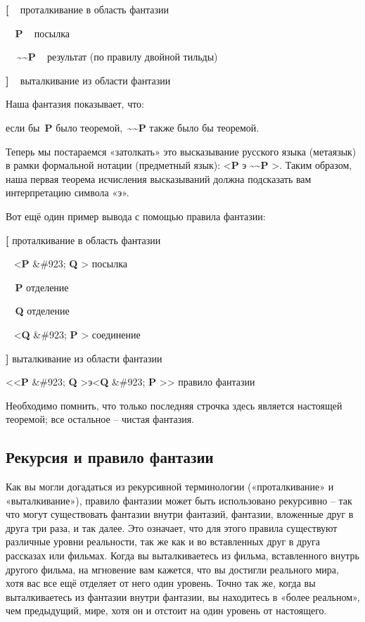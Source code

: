 \documentclass[../main.tex]{subfiles}
\begin{document}
\textbf{{[}} ~ проталкивание в область фантазии

\textbf{~ P} ~ посылка

\textbf{~~\textasciitilde\textasciitilde P} ~ результат (по правилу двойной тильды)

\textbf{{]}} ~ выталкивание из области фантазии

Наша фантазия показывает, что:

если бы~\textbf{P} было теоремой,~\textbf{\textasciitilde\textasciitilde P} также было бы теоремой.

Теперь мы постараемся «затолкать» это высказывание русского языка (метаязык) в рамки формальной нотации (предметный язык): \textless{}\textbf{P} э \textbf{\textasciitilde\textasciitilde P} \textgreater. Таким образом, наша первая теорема исчисления высказываний должна подсказать вам интерпретацию символа «э».

Вот ещё один пример вывода с помощью правила фантазии:

\textbf{{[}} проталкивание в область фантазии

~ \textless{}\textbf{P} \&\#923; \textbf{Q} \textgreater{} посылка

\textbf{~ P} отделение

\textbf{~ Q} отделение

~ \textless{}\textbf{Q} \&\#923; \textbf{P} \textgreater{} соединение

\textbf{{]}} выталкивание из области фантазии

\textless\textless{}\textbf{P} \&\#923; \textbf{Q} \textgreater э\textless{}\textbf{Q} \&\#923; \textbf{P} \textgreater\textgreater{} правило фантазии

Необходимо помнить, что только последняя строчка здесь является настоящей теоремой; все остальное \--- чистая фантазия.


\subsection{Рекурсия и правило фантазии}

Как вы могли догадаться из рекурсивной терминологии («проталкивание» и «выталкивание»), правило фантазии может быть использовано рекурсивно \--- так что могут существовать фантазии внутри фантазий, фантазии, вложенные друг в друга три раза, и так далее. Это означает, что для этого правила существуют различные уровни реальности, так же как и во вставленных друг в друга рассказах или фильмах. Когда вы выталкиваетесь из фильма, вставленного внутрь другого фильма, на мгновение вам кажется, что вы достигли реального мира, хотя вас все ещё отделяет от него один уровень. Точно так же, когда вы выталкиваетесь из фантазии внутри фантазии, вы находитесь в «более реальном», чем предыдущий, мире, хотя он и отстоит на один уровень от настоящего.
\end{document}
